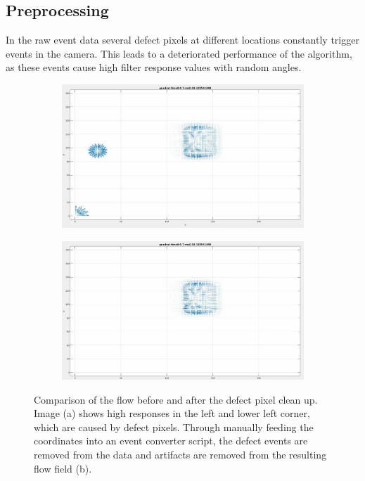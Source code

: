 \subsection{Preprocessing}
In the raw event data several defect pixels at different locations constantly trigger events in the camera.
This leads to a deteriorated performance of the algorithm, as these events cause high filter response values with random angles.

\begin{figure}[tb]
\centering
\begin{subfigure}{.45\textwidth}
  \centering
  \includegraphics[height=.5\linewidth]{figs/defect-pixels/defect-quadrat.png}
  \caption{}
\end{subfigure}
\begin{subfigure}{.45\textwidth}
  \centering
  \includegraphics[height=.5\linewidth]{figs/defect-pixels/cleaned-quadrat.png}  \caption{}
\end{subfigure}
\caption[Preprocessing step: Removing events from defect pixels.]{Comparison of the flow before and after the defect pixel clean up. Image (a) shows high responses in the left and lower left corner, which are caused by defect pixels. Through manually feeding the coordinates into an event converter script, the defect events are removed from the data and artifacts are removed from the resulting flow field (b).}
\label{fig:defect-pixel-cleanup}
\end{figure}


